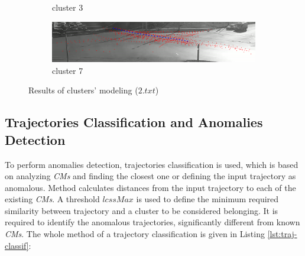 \begin{figure}[!htb]
\begin{subfigure}[!htb]{0.7\textwidth}
		\caption{cluster 3}
	\end{subfigure}
	\hfill
	\begin{subfigure}[!htb]{0.7\textwidth}
		\centering{}
		\includegraphics[width=\textwidth]{images/cm-7-from-8-0_95.png}
		\caption{cluster 7}
	\end{subfigure}
	
	\caption{Results of clusters' modeling ($2.txt$)}
	\label{fig:cm-res}
\end{figure}

\subsection{Trajectories Classification and Anomalies Detection}

To perform anomalies detection, trajectories classification is used, which is based on analyzing \textit{CMs} and finding the closest one or defining the input trajectory as anomalous. Method calculates distances from the input trajectory to each of the existing \textit{CMs}. A threshold $lcssMax$ is used to define the minimum required similarity between trajectory and a cluster to be considered belonging. It is required to identify the anomalous trajectories, significantly different from known \textit{CMs}. The whole method of a trajectory classification is given in Listing \ref{lst:traj-classif}:



